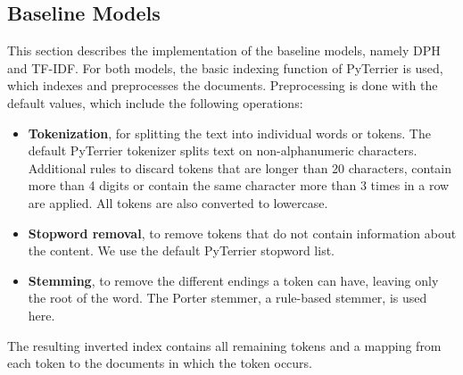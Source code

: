 \subsection{Baseline Models}
This section describes the implementation of the baseline models, namely DPH and TF-IDF.
For both models, the basic indexing function of PyTerrier is used, which indexes and preprocesses the documents.
Preprocessing is done with the default values, which include the following operations:
\begin{itemize}
    \item{\textbf{Tokenization}, for splitting the text into individual words or tokens. The default PyTerrier tokenizer splits text on non-alphanumeric characters. Additional rules to discard tokens that are longer than 20 characters, contain more than 4 digits or contain the same character more than 3 times in a row are applied. All tokens are also converted to lowercase.}
    \item \textbf{Stopword removal}, to remove tokens that do not contain information about the content. We use the default PyTerrier stopword list.
    \item \textbf{Stemming}, to remove the different endings a token can have, leaving only the root of the word. The Porter stemmer, a rule-based stemmer, is used here.
\end{itemize}
The resulting inverted index contains all remaining tokens and a mapping from each token to the documents in which the token occurs.

